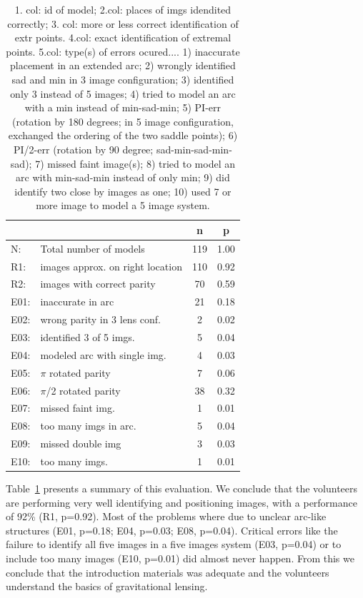 \documentclass[12pt,preprint]{aastex}
\newcommand{\tabref}[1]{Table~\ref{tab:#1}}
\begin{document}
\begin{table}\centering\begin{tabular}{llcc}\hline
 & & n & p \\
\hline
 N: & Total number of models & 119 & 1.00\\
\hline
 R1: & images approx. on right location & 110 & 0.92\\
 R2: & images with correct parity & 70 & 0.59\\
\hline
 E01: & inaccurate in arc & 21 & 0.18\\
 E02: & wrong parity in 3 lens conf. & 2 & 0.02\\
 E03: & identified 3 of 5 imgs. & 5 & 0.04\\
 E04: & modeled arc with single img. & 4 & 0.03\\
 E05: & $\pi$ rotated parity & 7 & 0.06\\
 E06: & $\pi$/2 rotated parity & 38 & 0.32\\
 E07: & missed faint img. & 1 & 0.01\\
 E08: & too many imgs in arc. & 5 & 0.04\\
 E09: & missed double img & 3 & 0.03\\
 E10: & too many imgs. & 1 & 0.01\\
\end{tabular}

\caption{1. col: id of model; 2.col: places of imgs idendited
  correctly; 3. col: more or less correct identification of extr
  points. 4.col: exact identification of extremal points. 5.col:
  type(s) of errors ocured....  1) inaccurate placement in an extended
  arc; 2) wrongly identified sad and min in 3 image configuration; 3)
  identified only 3 instead of 5 images; 4) tried to model an arc with
  a min instead of min-sad-min; 5) PI-err (rotation by 180 degrees; in
  5 image configuration, exchanged the ordering of the two saddle
  points); 6) PI/2-err (rotation by 90 degree; sad-min-sad-min-sad);
  7) missed faint image(s); 8) tried to model an arc with min-sad-min
  instead of only min; 9) did identify two close by images as one; 10)
  used 7 or more image to model a 5 image system. }

\label{tab:stats}
\end{table}


\tabref{stats} presents a summary of this evaluation.
We conclude that the volunteers are performing very well identifying and positioning images, with a performance of 92\% (R1, p=0.92).
Most of the problems where due to unclear arc-like structures (E01, p=0.18; E04, p=0.03; E08, p=0.04).
Critical errors like the failure to identify all five images in a five images system (E03, p=0.04) or to include too many images (E10, p=0.01) did almost never happen.
From this we conclude that the introduction materials was adequate and the volunteers understand the basics of gravitational lensing.
\end{document}
